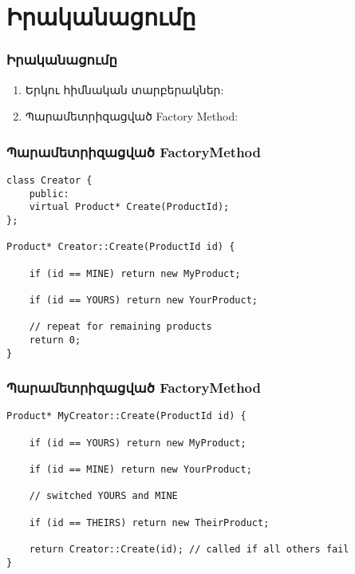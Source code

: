 \documentclass{beamer}
\begin{document}
\section{Իրականացումը}
\begin{frame}\frametitle{Իրականացումը}
\begin{enumerate}
    \item Երկու հիմնական տարբերակներ: \vspace{0.5cm}
    \item Պարամետրիզացված Factory Method: \vfill
\end{enumerate}
\end{frame}

\begin{frame}[fragile]\frametitle{Պարամետրիզացված FactoryMethod}
\begin{english}
\begin{verbatim}
class Creator {
    public:
    virtual Product* Create(ProductId);
};

Product* Creator::Create(ProductId id) {

    if (id == MINE) return new MyProduct;

    if (id == YOURS) return new YourProduct;

    // repeat for remaining products
    return 0;
}
\end{verbatim}
\end{english}
\end{frame}

\begin{frame}[fragile]\frametitle{Պարամետրիզացված FactoryMethod}
\begin{english}
\begin{verbatim}
Product* MyCreator::Create(ProductId id) {

    if (id == YOURS) return new MyProduct;

    if (id == MINE) return new YourProduct;

    // switched YOURS and MINE

    if (id == THEIRS) return new TheirProduct;

    return Creator::Create(id); // called if all others fail
}
\end{verbatim}
\end{english}
\end{frame}
\end{document}
